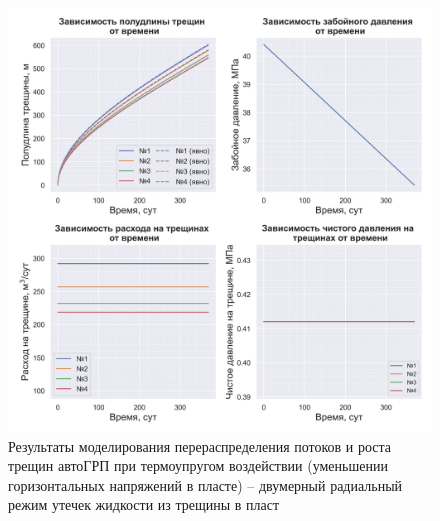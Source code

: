 \begin{figure}[H] 
\center
\includegraphics[width=\linewidth]{images/myimage12.jpg}
\caption{Результаты моделирования перераспределения потоков и роста трещин автоГРП при термоупругом воздействии (уменьшении горизонтальных напряжений в пласте) -- двумерный радиальный режим утечек жидкости из трещины в пласт}
\label{fig:myimage12}
\end{figure}

